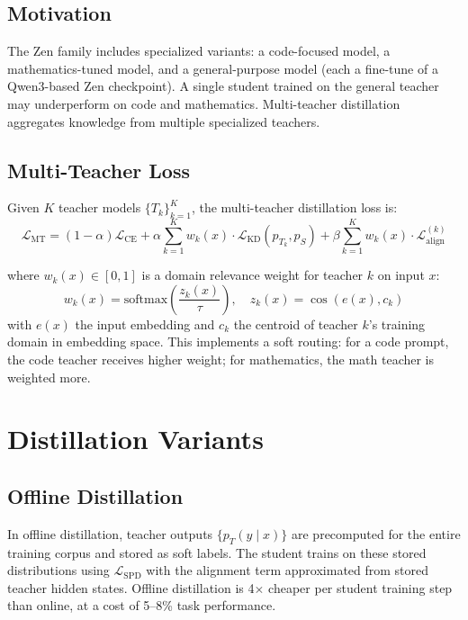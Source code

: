 \documentclass[11pt,a4paper]{article}
\begin{document}
\subsection{Motivation}

The Zen family includes specialized variants: a code-focused model, a mathematics-tuned
model, and a general-purpose model (each a fine-tune of a Qwen3-based Zen checkpoint).
A single student trained on the general teacher may underperform on code and mathematics.
Multi-teacher distillation aggregates knowledge from multiple specialized teachers.

\subsection{Multi-Teacher Loss}

Given $K$ teacher models $\{T_k\}_{k=1}^K$, the multi-teacher distillation loss is:
\begin{equation}
    \mathcal{L}_{\text{MT}} = (1-\alpha)\mathcal{L}_{\text{CE}} +
    \alpha \sum_{k=1}^{K} w_k(x) \cdot \mathcal{L}_{\text{KD}}(p_{T_k}, p_S) +
    \beta \sum_{k=1}^{K} w_k(x) \cdot \mathcal{L}_{\text{align}}^{(k)}
    \label{eq:mt_loss}
\end{equation}

where $w_k(x) \in [0,1]$ is a domain relevance weight for teacher $k$ on input $x$:
\begin{equation}
    w_k(x) = \text{softmax}\!\left(\frac{z_k(x)}{\tau}\right), \quad
    z_k(x) = \cos(e(x), c_k)
    \label{eq:teacher_weight}
\end{equation}
with $e(x)$ the input embedding and $c_k$ the centroid of teacher $k$'s training domain
in embedding space. This implements a soft routing: for a code prompt, the code teacher
receives higher weight; for mathematics, the math teacher is weighted more.

\section{Distillation Variants}
\label{sec:variants}

\subsection{Offline Distillation}

In offline distillation, teacher outputs $\{p_T(y \mid x)\}$ are precomputed for the
entire training corpus and stored as soft labels. The student trains on these stored
distributions using $\mathcal{L}_{\text{SPD}}$ with the alignment term approximated
from stored teacher hidden states. Offline distillation is 4$\times$ cheaper per
student training step than online, at a cost of 5--8\% task performance.
\end{document}
